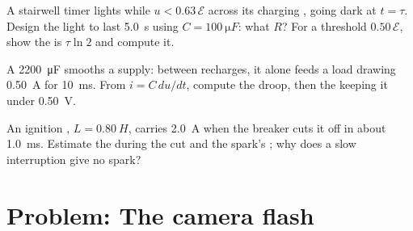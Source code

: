 \begin{exercise}[$\star\star\star$]\label{exo:g12:rc-rl-circuits:13}
A stairwell timer lights while $u < 0.63\,\mathcal{E}$ across its
charging , going dark at $t = \tau$. Design the light to last
\qty{5.0}{s} using $C = \qty{100}{\micro F}$: what $R$? For a threshold
$0.50\,\mathcal{E}$, show the  is $\tau \ln 2$ and compute it.
\end{exercise}

\begin{exercise}[$\star\star\star$]\label{exo:g12:rc-rl-circuits:14}
A \qty{2200}{\micro F}  smooths a supply: between recharges,
it alone feeds a load drawing \qty{0.50}{A} for \qty{10}{ms}. From
$i = C\,du/dt$, compute the  droop, then the 
keeping it under \qty{0.50}{V}.
\end{exercise}

\begin{exercise}[$\star\star\star$]\label{exo:g12:rc-rl-circuits:15}
An ignition , $L = \qty{0.80}{H}$, carries \qty{2.0}{A} when the
breaker cuts it off in about \qty{1.0}{ms}. Estimate the  
during the cut and the spark's ; why does a slow interruption
give no spark?
\end{exercise}

\section{Problem: The camera flash}

